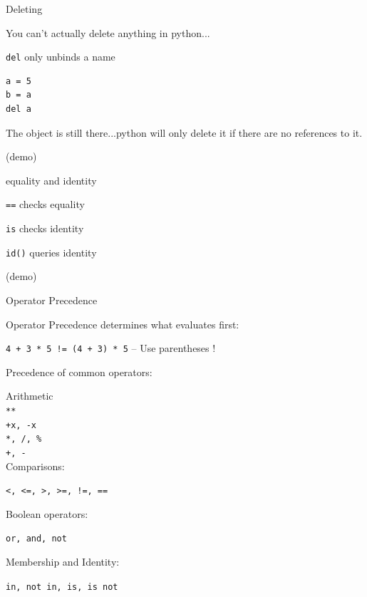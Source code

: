 \documentclass{beamer}
\begin{document}
\begin{frame}[fragile]{Deleting}

{\large You can't actually delete anything in python...}

\vfill

{\large \verb|del| only unbinds a name}

\vfill
\begin{verbatim}
a = 5
b = a
del a
\end{verbatim}

The object is still there...python will only delete it if there are no references to it.

\vfill
(demo)

\end{frame}


\begin{frame}[fragile]{equality and identity}

{\large
\vspace{0.1in}
\verb|==| checks equality

\vspace{0.1in}
\verb|is| checks identity

\vspace{0.1in}
\verb|id()| queries identity
}

\vspace{0.2in}
(demo)


\end{frame}


\begin{frame}[fragile]{Operator Precedence}

{Operator Precedence determines what evaluates first:}

\verb^4 + 3 * 5 != (4 + 3) * 5^  --  Use parentheses !

Precedence of common operators:

Arithmetic \\
\verb!**! \\
\verb!+x, -x! \\	
\verb!*, /, %!	\\
\verb!+, -! \\

Comparisons:

\verb^<, <=, >, >=, !=, ==^

Boolean operators:
 
\verb!or, and, not!

Membership and Identity:

\verb!in, not in, is, is not!

\end{frame}
\end{document}
